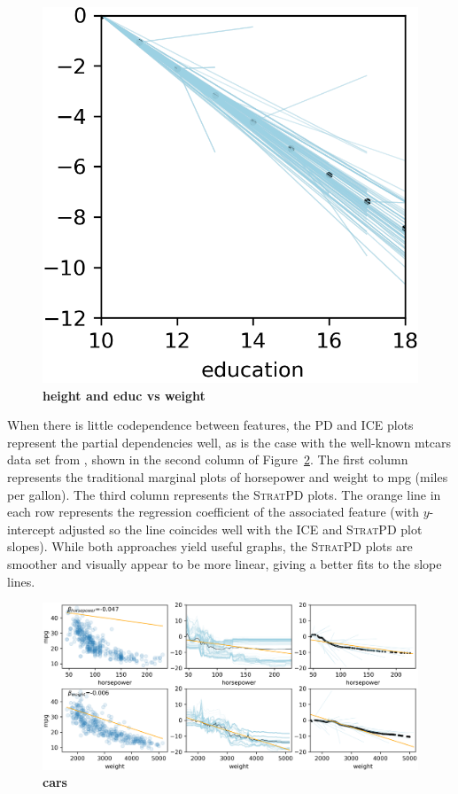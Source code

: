 \documentclass[12pt]{article}
\newcommand{\figref}[1]{Figure~\ref{#1}}
\newcommand{\spd}{\fontfamily{cmr}\textsc{\small StratPD}}
\begin{document}
\begin{figure}[htbp]
\begin{center}
\includegraphics[scale=0.7]{images/education_vs_weight_stratpd.png}
\caption{{\bf  height and educ vs weight}}
\label{fig:height_education_vs_weight}
\end{center}
\end{figure}

When there is little codependence between features, the PD and ICE plots represent the partial dependencies well, as is the case with the well-known mtcars data set from \cite{mtcars}, shown in the second column of \figref{fig:cars}.  The first column represents the traditional marginal plots of horsepower and weight to mpg (miles per gallon). The third column represents the \spd{} plots. The orange line in each row represents the regression coefficient of the associated feature (with $y$-intercept adjusted so the line coincides well with the ICE and \spd{} plot slopes).  While both approaches yield useful graphs, the \spd{} plots are smoother and visually appear to be more linear, giving a better fits to the slope lines.

\begin{figure}[htbp]
\begin{center}
\includegraphics[scale=0.7]{images/cars.png}
\caption{{\bf  cars}}
\label{fig:cars}
\end{center}
\end{figure}
\end{document}

